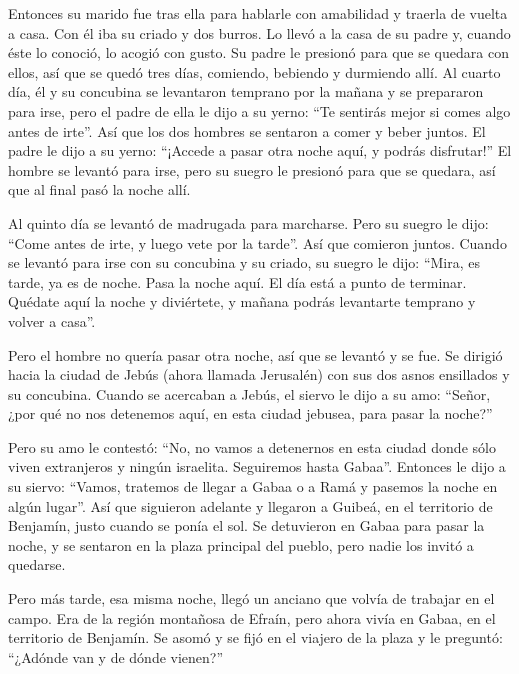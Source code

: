  Entonces su marido fue tras ella para hablarle con
amabilidad y traerla de vuelta a casa. Con él iba su criado y dos
burros. Lo llevó a la casa de su padre y, cuando éste lo conoció, lo
acogió con gusto.  Su padre le presionó para que se quedara
con ellos, así que se quedó tres días, comiendo, bebiendo y durmiendo
allí.  Al cuarto día, él y su concubina se levantaron
temprano por la mañana y se prepararon para irse, pero el padre de ella
le dijo a su yerno: ``Te sentirás mejor si comes algo antes de irte''.
 Así que los dos hombres se sentaron a comer y beber juntos.
El padre le dijo a su yerno: ``¡Accede a pasar otra noche aquí, y podrás
disfrutar!''  El hombre se levantó para irse, pero su suegro
le presionó para que se quedara, así que al final pasó la noche allí.

 Al quinto día se levantó de madrugada para marcharse. Pero
su suegro le dijo: ``Come antes de irte, y luego vete por la tarde''.
Así que comieron juntos.  Cuando se levantó para irse con su
concubina y su criado, su suegro le dijo: ``Mira, es tarde, ya es de
noche. Pasa la noche aquí. El día está a punto de terminar. Quédate aquí
la noche y diviértete, y mañana podrás levantarte temprano y volver a
casa''.

 Pero el hombre no quería pasar otra noche, así que se
levantó y se fue. Se dirigió hacia la ciudad de Jebús (ahora llamada
Jerusalén) con sus dos asnos ensillados y su concubina. 
Cuando se acercaban a Jebús, el siervo le dijo a su amo: ``Señor, ¿por
qué no nos detenemos aquí, en esta ciudad jebusea, para pasar la
noche?''

 Pero su amo le contestó: ``No, no vamos a detenernos en
esta ciudad donde sólo viven extranjeros y ningún israelita. Seguiremos
hasta Gabaa''.  Entonces le dijo a su siervo: ``Vamos,
tratemos de llegar a Gabaa o a Ramá y pasemos la noche en algún lugar''.
 Así que siguieron adelante y llegaron a Guibeá, en el
territorio de Benjamín, justo cuando se ponía el sol.  Se
detuvieron en Gabaa para pasar la noche, y se sentaron en la plaza
principal del pueblo, pero nadie los invitó a quedarse.

 Pero más tarde, esa misma noche, llegó un anciano que
volvía de trabajar en el campo. Era de la región montañosa de Efraín,
pero ahora vivía en Gabaa, en el territorio de Benjamín. 
Se asomó y se fijó en el viajero de la plaza y le preguntó: ``¿Adónde
van y de dónde vienen?''

